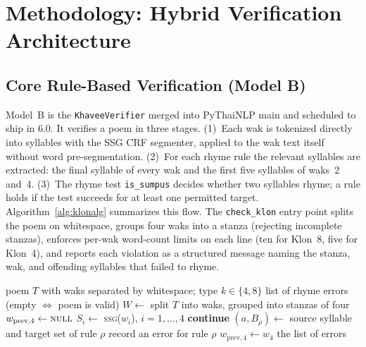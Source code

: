 \documentclass[conference]{IEEEtran}
\begin{document}

\section{Methodology: Hybrid Verification Architecture}

\subsection{Core Rule-Based Verification (Model B)}

Model~B is the \texttt{KhaveeVerifier} merged into PyThaiNLP main and scheduled to ship in 6.0.
It verifies a poem in three stages. (1)~Each wak is tokenized directly into syllables
with the SSG CRF segmenter, applied to the wak text itself without word
pre-segmentation. (2)~For each rhyme rule the relevant syllables are
extracted: the final syllable of every wak and the first five syllables of
waks~2 and~4. (3)~The rhyme test \texttt{is\_sumpus} decides whether two
syllables rhyme; a rule holds if the test succeeds for at least one
permitted target. Algorithm~\ref{alg:klonalg} summarizes this flow.
The \texttt{check\_klon}
entry point splits the poem on whitespace, groups four waks into a
stanza (rejecting incomplete stanzas), enforces per-wak word-count limits
on each line (ten for Klon~8, five for Klon~4), and reports
each violation as a structured message naming the stanza, wak, and
offending syllables that failed to rhyme.

\begin{algorithm}[t]
\caption{Rhyme verification of a Klon-Paed poem (\texttt{check\_klon}).}
\label{alg:klonalg}
\begin{algorithmic}[1]
\REQUIRE poem $T$ with waks separated by whitespace; type $k\in\{4,8\}$
\ENSURE list of rhyme errors (empty $\Leftrightarrow$ poem is valid)
\STATE $W\gets$ split $T$ into waks, grouped into stanzas of four
\STATE $w_{\mathrm{prev},4}\gets\textsc{null}$
  \STATE $S_i\gets$ \textsc{ssg}($w_i$), $i=1,\ldots,4$ 
      \STATE \textbf{continue} 
    \ENDIF
    \STATE $(a,B_\rho)\gets$ source syllable and target set of rule $\rho$
      \STATE record an error for rule $\rho$
    \ENDIF
  \ENDFOR
  \STATE $w_{\mathrm{prev},4}\gets w_4$ 
\ENDFOR
\RETURN the list of errors
\end{algorithmic}
\end{algorithm}
\end{document}
